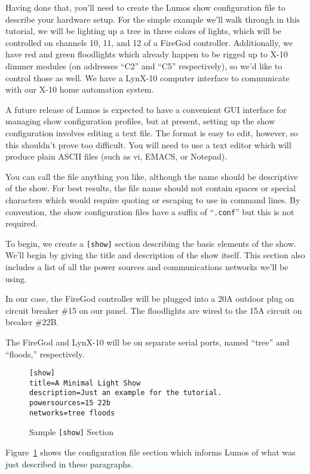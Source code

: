 \documentclass{article}
\begin{document}
Having done that, you'll need to create the Lumos show configuration file to
describe your hardware setup.  For the simple example we'll walk through in
this tutorial, we will be lighting up a tree in three colors of lights, which
will be controlled on channels 10, 11, and 12 of a FireGod controller.
Additionally, we have red and green floodlights which already happen to be
rigged up to X-10 dimmer modules (on addresses ``C2'' and ``C5'' respectively),
so we'd like to control those as well.
We have a LynX-10 computer interface to communicate with our X-10 home
automation system.

A future release of Lumos is expected to have a convenient GUI interface for
managing show configuration profiles, but at present, setting up the show
configuration involves editing a text file.  The format is easy to edit,
however, so this shouldn't prove too difficult.  You will need to use a text
editor which will produce plain ASCII files (such as vi, EMACS, or Notepad).

You can call the file anything you like, although the name should be
descriptive of the show.  For best results, the file name should not contain
spaces or special characters which would require quoting or escaping to use in
command lines.  By convention, the show configuration files have a suffix of
``{\tt.conf}'' but this is not required.

To begin, we create a {\tt[show]} section describing the basic elements of the
show.  We'll begin by giving the title and description of the show itself.
This section also includes a list of all the power sources and communications
networks we'll be using.

In our case, the FireGod controller will be plugged into a 20A outdoor plug on
circuit breaker \#15 on our panel.  The floodlights are wired to the 15A
circuit on breaker \#22B.

The FireGod and LynX-10 will be on separate serial ports, named ``tree'' and
``floods,'' respectively.

\begin{figure}[htbp]
\begin{verbatim}
[show]
title=A Minimal Light Show
description=Just an example for the tutorial.
powersources=15 22b
networks=tree floods
\end{verbatim}
\caption{Sample {\tt[show]} Section}
\label{conf:show}
\end{figure}

Figure~\ref{conf:show} shows the configuration file section which informs 
Lumos of what was just described in these paragraphs.
\end{document}
